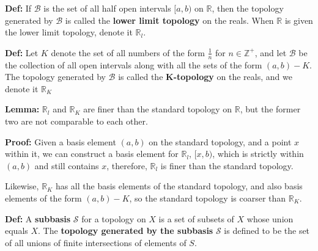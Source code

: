 \documentclass{article}
\begin{document}
\textbf{Def:} If $\mathcal{B}$ is the set of all half open intervals $[a,b)$ on $\mathbb{R}$, then the topology generated by $\mathcal{B}$ is called the \textbf{lower limit topology} on the reals. When $\mathbb{R}$ is given the lower limit topology, denote it $\mathbb{R}_l$. 

\textbf{Def:} Let $K$ denote the set of all numbers of the form $\frac{1}{n}$ for $n \in \mathbb{Z}^+$, and let $\mathcal{B}$ be the collection of all open intervals along with all the sets of the form $(a,b)-K$. The topology generated by $\mathcal{B}$ is called the \textbf{K-topology} on the reals, and we denote it $\mathbb{R}_K$

\textbf{Lemma:} $\mathbb{R}_l$ and $\mathbb{R}_K$ are finer than the standard topology on $\mathbb{R}$, but the former two are not comparable to each other.

\textbf{Proof:} Given a basis element $(a,b)$ on the standard topology, and a point $x$ within it, we can construct a basis element for $\mathbb{R}_l$, $[x,b)$, which is strictly within $(a,b)$ and still contains $x$, therefore, $\mathbb{R}_l$ is finer than the standard topology.

Likewise, $\mathbb{R}_K$ has all the basis elements of the standard topology, and also basis elements of the form $(a,b)-K$, so the standard topology is coarser than $\mathbb{R}_K$.

\textbf{Def:} A \textbf{subbasis} $\mathcal{S}$ for a topology on $X$ is a set of subsets of $X$ whose union equals $X$. The \textbf{topology generated by the subbasis} $\mathcal{S}$ is defined to be the set of all unions of finite intersections of elements of $S$.     
\end{document}
